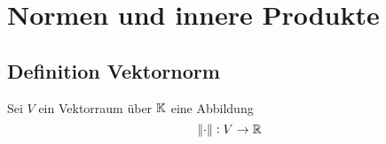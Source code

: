 \section{Normen und innere Produkte}
\subsection{Definition Vektornorm}
Sei $V$ ein Vektorraum über $\mathbb{K}$ eine Abbildung
\begin{equation*}
	\norm{\cdot}: V \rightarrow \mathbb{R}
\end{equation*}